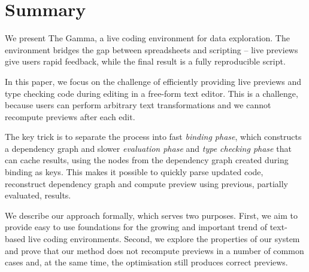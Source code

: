 \documentclass[acmsmall,anonymous,fleqn]{acmart}\settopmatter{printfolios=false,printccs=false,printacmref=false}
\theoremstyle{plain}
\theoremstyle{definition}
\begin{document}
%
%
%
%
%
%
%
%
%
%
%
%
%
\section{Summary}
We present The Gamma, a live coding environment for data exploration. The environment
bridges the gap between spreadsheets and scripting -- live previews give users rapid feedback,
while the final result is a fully reproducible script.

In this paper, we focus on the challenge of efficiently providing live previews and type checking
code during editing in a free-form text editor. This is a challenge, because users can perform
arbitrary text transformations and we cannot recompute previews after each edit.

The key trick is to separate the process into fast \emph{binding phase},
which constructs a dependency graph and slower \emph{evaluation phase} and \emph{type checking phase}
that can cache results, using the nodes from the dependency graph created during binding as keys.
This makes it possible to quickly parse updated code, reconstruct dependency graph and compute
preview using previous, partially evaluated, results.

We describe our approach formally, which serves two purposes. First, we aim to provide easy to
use foundations for the growing and important trend of text-based live coding environments.
Second, we explore the properties of our system and prove that our method does not recompute
previews in a number of common cases and, at the same time, the optimisation still produces
correct previews.
\end{document}
